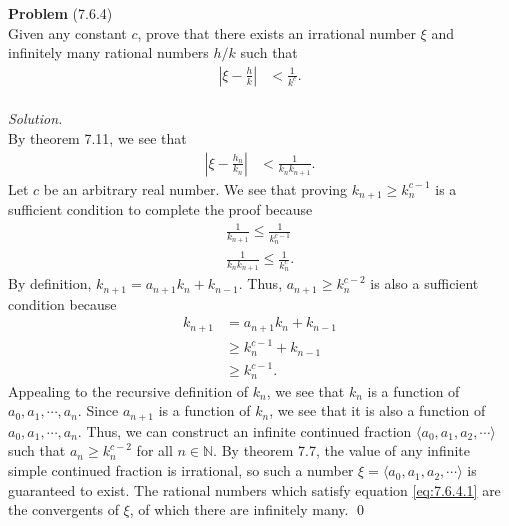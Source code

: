 \documentclass[12 pt]{amsart}
\begin{document}
\phantom{\quad} \vfill
\noindent
\textbf{Problem} (7.6.4) \\[4ex]
  Given any constant $c$, prove that there exists an irrational
  number $\xi$ and infinitely many rational numbers
  $h/k$ such that 
  \begin{align}
    \label{eq:7.6.4.1}
    \left| \xi - \frac{h}{k} \right| &< \frac{1}{k^c}.
  \end{align}
  \\[2ex]
\emph{Solution.} \\[2ex]
  By theorem 7.11, we see that 
  \begin{align*}
    \left| \xi - \frac{h_n}{k_n} \right| &< \frac{1}{k_n k_{n+1}}.
  \end{align*}
  Let $c$ be an arbitrary real number.
  We see that proving $k_{n+1} \geq k_n^{c-1}$ is a sufficient
  condition to complete the proof because
  \begin{align*}
    \frac{1}{k_{n+1}} \leq \frac{1}{k_n^{c-1}} \\
    \frac{1}{k_n k_{n+1}} \leq \frac{1}{k_n^{c}}.
  \end{align*}
  By definition, $k_{n+1} = a_{n+1} k_n + k_{n-1}$.
  Thus, $a_{n+1} \geq k_n^{c-2}$ is also a sufficient condition
  because
  \begin{align*}
    k_{n+1} &= a_{n+1} k_n + k_{n-1} \\
            &\geq k_n^{c-1} + k_{n-1} \\ 
            &\geq k_n^{c-1}.
  \end{align*}
  Appealing to the recursive definition of $k_n$, we see that
  $k_n$ is a function of $a_0, a_1, \cdots, a_n$.
  Since $a_{n+1}$ is a function of $k_n$, we see that 
  it is also a function of $a_0, a_1, \cdots, a_n$.
  Thus, we can construct an infinite continued fraction 
  $\langle a_0, a_1, a_2, \cdots \rangle$ such that 
  $a_n \geq k_n^{c-2}$ for all $n \in \mathbb{N}$.
  By theorem 7.7, the value of any infinite simple continued
  fraction is irrational, so such a number
  $\xi = \langle a_0, a_1, a_2, \cdots \rangle$ is guaranteed
  to exist. 
  The rational numbers which satisfy equation 
  \ref{eq:7.6.4.1}
  are the convergents of $\xi$, of which there are 
  infinitely many.
  \qed
\vfill
\newpage
\end{document}
